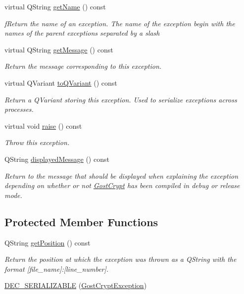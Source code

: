 \begin{DoxyCompactItemize}
virtual Q\+String \hyperlink{class_gost_crypt_1_1_gost_crypt_exception_a7f4c5d03898b8bb8337474c9f537ddee}{get\+Name} () const
\begin{DoxyCompactList}\small\item\em f\+Return the name of an exception. The name of the exception begin with the names of the parent exceptions separated by a slash \end{DoxyCompactList}\item 
virtual Q\+String \hyperlink{class_gost_crypt_1_1_gost_crypt_exception_a5b4b89768abab6d495bb8e8ebb08fd29}{get\+Message} () const
\begin{DoxyCompactList}\small\item\em Return the message corresponding to this exception. \end{DoxyCompactList}\item 
virtual Q\+Variant \hyperlink{class_gost_crypt_1_1_gost_crypt_exception_a657b09e56315556e82ad56b4a38673d2}{to\+Q\+Variant} () const
\begin{DoxyCompactList}\small\item\em Return a Q\+Variant storing this exception. Used to serialize exceptions across processes. \end{DoxyCompactList}\item 
virtual void \hyperlink{class_gost_crypt_1_1_gost_crypt_exception_ae3aef8384d1d66dacb66ac5684bb4694}{raise} () const
\begin{DoxyCompactList}\small\item\em Throw this exception. \end{DoxyCompactList}\item 
Q\+String \hyperlink{class_gost_crypt_1_1_gost_crypt_exception_a69ae9972b73e6f7e9bc72b2ec4d4901b}{displayed\+Message} () const
\begin{DoxyCompactList}\small\item\em Return to the message that should be displayed when explaining the exception depending on whether or not \hyperlink{namespace_gost_crypt}{Gost\+Crypt} has been compiled in debug or release mode. \end{DoxyCompactList}\end{DoxyCompactItemize}
\subsection*{Protected Member Functions}
\begin{DoxyCompactItemize}
\item 
Q\+String \hyperlink{class_gost_crypt_1_1_gost_crypt_exception_a31b4dfdc5d4ad624887bd8fa3aa442b0}{get\+Position} () const
\begin{DoxyCompactList}\small\item\em Return the position at which the exception was thrown as a Q\+String with the format \mbox{[}file\+\_\+name\mbox{]}\+:\mbox{[}line\+\_\+number\mbox{]}. \end{DoxyCompactList}\item 
\hyperlink{class_gost_crypt_1_1_gost_crypt_exception_a65d2a9d456facdbd25d990d2e0b46633}{D\+E\+C\+\_\+\+S\+E\+R\+I\+A\+L\+I\+Z\+A\+B\+LE} (\hyperlink{class_gost_crypt_1_1_gost_crypt_exception}{Gost\+Crypt\+Exception})
\end{DoxyCompactItemize}
